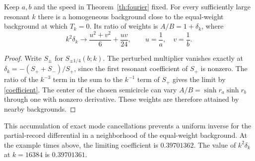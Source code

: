\begin{proposition}
\label{prop:detune}
Keep $a,b$ and the speed in Theorem~\ref{th:fourier} fixed.
For every sufficiently large resonant $k$ there is a
homogeneous background close to the equal-weight background
at which $T_k=0$. Its ratio of weights is $A/B=1+\delta_k$,
where
\[
 k^2\delta_k\longrightarrow
   \frac{u^2+v^2}{6}+\frac{uv}{24},\qquad
   u=\frac1a,\quad v=\frac1b.
\]
\end{proposition}

\begin{proof}
Write $S_\pm$ for $S_{\pm1/4}(b;k)$.
The perturbed multiplier vanishes exactly at
$\delta_k=-(S_++S_-)/S_+$, since the first resonant
coefficient of $S_+$ is nonzero. The ratio of the
$k^{-3}$ term in the sum to the $k^{-1}$ term of
$S_+$ gives the limit by \eqref{coefficient}.
The center of the chosen semicircle can vary
$A/B=\sinh r_a\sinh r_b$ through one with nonzero
derivative. These weights are therefore attained
by nearby backgrounds.
\end{proof}

This accumulation of exact mode cancellations prevents a
uniform inverse for the partial-record differential in a
neighborhood of the equal-weight background. At the example
times above, the limiting coefficient is $0.39701362$.
The value of $k^2\delta_k$ at $k=16384$ is $0.39701361$.
